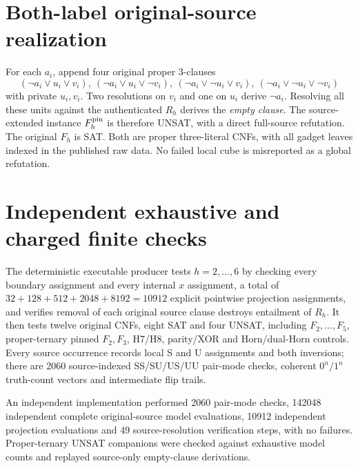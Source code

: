 \documentclass[11pt]{article}
\begin{document}
\section{Both-label original-source realization}
For each $a_i$, append four original proper 3-clauses
\[
(\neg a_i\vee u_i\vee v_i),\
(\neg a_i\vee u_i\vee\neg v_i),\
(\neg a_i\vee\neg u_i\vee v_i),\
(\neg a_i\vee\neg u_i\vee\neg v_i)
\tag{3}
\]
with private $u_i,v_i$. Two resolutions on $v_i$ and one on $u_i$
derive $\neg a_i$. Resolving all these units against the authenticated
$R_h$ derives the \emph{empty clause}. The source-extended instance
$F_h^{\rm pin}$ is therefore UNSAT, with a direct full-source refutation.
The original $F_h$ is SAT. Both are proper three-literal CNFs,
with all gadget leaves indexed in the published raw data.
No failed local cube is misreported as a global refutation.

\section{Independent exhaustive and charged finite checks}
The deterministic executable producer tests $h=2,\ldots,6$ by
checking every boundary assignment and every internal $x$ assignment,
a total of $32+128+512+2048+8192=10912$ explicit pointwise
projection assignments, and verifies removal of each original source
clause destroys entailment of $R_h$. It then tests twelve original
CNFs, eight SAT and four UNSAT, including $F_2,\ldots,F_5$,
proper-ternary pinned $F_2,F_3$, H7/H8, parity/XOR and
Horn/dual-Horn controls. Every source occurrence records local
S and U assignments and both inversions; there are
2060 source-indexed SS/SU/US/UU pair-mode checks, coherent
$0^n/1^n$ truth-count vectors and intermediate flip trails.

An independent implementation performed 2060 pair-mode checks,
142048 independent complete original-source model evaluations,
10912 independent projection evaluations and 49
source-resolution verification steps, with no failures.
Proper-ternary UNSAT companions were checked against exhaustive
model counts and replayed source-only empty-clause derivations.
\end{document}
